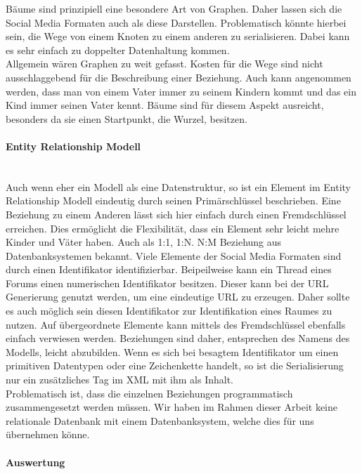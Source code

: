 \documentclass[a4paper]{article}
\begin{document}
	Bäume sind prinzipiell eine besondere Art von Graphen. Daher lassen sich
	die Social Media Formaten auch als diese Darstellen. Problematisch
	könnte hierbei sein, die Wege von einem Knoten zu einem anderen zu
	serialisieren. Dabei kann es sehr einfach zu doppelter Datenhaltung kommen. \\
	
	Allgemein wären Graphen zu weit gefasst. Kosten für die Wege sind nicht
	ausschlaggebend für die Beschreibung einer Beziehung. Auch kann angenommen
	werden, dass man von einem Vater immer zu seinem Kindern kommt und das ein Kind
	immer seinen Vater kennt. Bäume sind für diesem Aspekt ausreicht, besonders da
	sie einen Startpunkt, die Wurzel, besitzen.
	
	\paragraph{Entity Relationship Modell}\mbox{} \\
	
	Auch wenn eher ein Modell als eine Datenstruktur, so ist ein Element im
	Entity Relationship Modell eindeutig durch seinen Primärschlüssel beschrieben.
	Eine Beziehung zu einem Anderen lässt sich hier einfach durch einen
	Fremdschlüssel erreichen. Dies ermöglicht die Flexibilität, dass ein Element
	sehr leicht mehre Kinder und Väter haben. Auch als 1:1, 1:N. N:M Beziehung
	aus Datenbanksystemen bekannt. Viele Elemente der Social Media Formaten sind
	durch einen Identifikator identifizierbar. Beipeilweise kann ein Thread eines
	Forums einen numerischen Identifikator besitzen. Dieser kann bei der
	URL Generierung	genutzt werden, um eine eindeutige URL zu erzeugen. Daher sollte
	es auch möglich sein diesen Identifikator zur Identifikation eines Raumes zu
	nutzen. Auf übergeordnete Elemente kann mittels des Fremdschlüssel ebenfalls
	einfach verwiesen werden. Beziehungen sind daher, entsprechen des Namens des
	Modells, leicht abzubilden.	Wenn es sich bei besagtem Identifikator um einen
	primitiven Datentypen oder eine Zeichenkette handelt, so ist die
	Serialisierung nur ein zusätzliches Tag im XML mit ihm als Inhalt. \\
	
	Problematisch ist, dass die einzelnen Beziehungen programmatisch 
	zusammengesetzt werden müssen. Wir haben im Rahmen dieser Arbeit keine
	relationale	Datenbank mit einem Datenbanksystem, welche dies für uns übernehmen
	könne.
	
	\paragraph{Auswertung}\mbox{} \\
	
\end{document}
